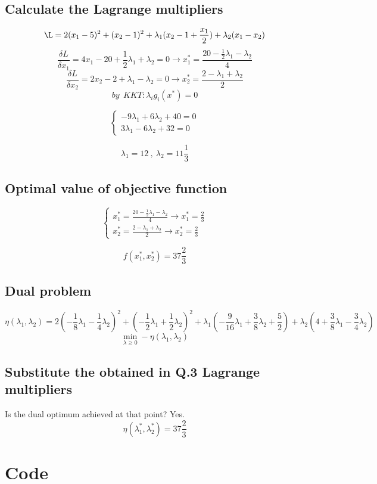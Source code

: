 \documentclass[12pt]{article}
\begin{document}
\subsection{Calculate the Lagrange multipliers}
\[\L=2(x_1-5)^2+(x_2-1)^2 +\lambda_1(x_2-1
+\frac{x_1}{2}) +\lambda_2(x_1-x_2) \]
\[\frac{\delta L}{\delta x_1} = 4 x_1 -20 + \frac{1}{2} \lambda_1 + \lambda_2 = 0 \longrightarrow x_1^* = \frac{20-\frac{1}{2}\lambda_1-\lambda_2}{4} \]
\[\frac{\delta L}{\delta x_2} = 2x_2-2+\lambda_1-\lambda_2=0 \longrightarrow x_2^*=\frac{2-\lambda_1+\lambda_2}{2} \]
\[by \ \ KKT: \lambda_i g_i(x^*)=0 \]

\[
\left\{
\begin{array}{ll}
-9\lambda_1+6\lambda_2+40=0 \\
3\lambda_1-6\lambda_2+32=0
\end{array}
\right.
\]

\[\lambda_1=12 \ , \ \lambda_2=11\frac{1}{3} \]

\subsection{Optimal value of objective function}
\[
\left\{
\begin{array}{ll}
x_1^* = \frac{20-\frac{1}{2}\lambda_1-\lambda_2}{4} \longrightarrow x_1^* = \frac{2}{3}\\
x_2^*=\frac{2-\lambda_1+\lambda_2}{2} \longrightarrow x_2^* = \frac{2}{3}
\end{array}
\right.
\]

\[f(x_1^*,x_2^*)=37 \frac{2}{3} \]

\subsection{Dual problem}
\[\eta(\lambda_1, \lambda_2) = 2(-\frac{1}{8}\lambda_1-\frac{1}{4}\lambda_2)^2 + (-\frac{1}{2}\lambda_1+\frac{1}{2}\lambda_2)^2 + \lambda_1 (-\frac{9}{16}\lambda_1 +\frac{3}{8}\lambda_2+\frac{5}{2})+\lambda_2 (4+\frac{3}{8}\lambda_1-\frac{3}{4}\lambda_2) \]
\[\min_{\lambda \geq 0} -\eta(\lambda_1, \lambda_2) \]

\subsection{Substitute the obtained in Q.3 Lagrange multipliers}
Is the dual optimum achieved at that point? Yes.
\[\eta(\lambda_1^*, \lambda_2^*) = 37 \frac{2}{3} \]

\newpage
\section{Code}
\end{document}
